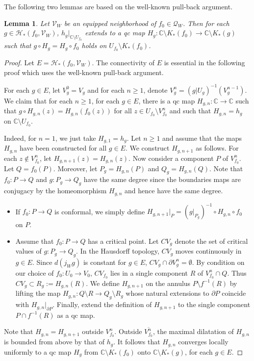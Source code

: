 \documentclass{amsart}
\numberwithin{equation}{section}
\newtheorem{lemma}[theorem]{Lemma}%
\newcommand{\C}{\mathbb C}
\theoremstyle{definition}
\theoremstyle{remark}
\begin{document}
The following two lemmas are based on the well-known pull-back argument. 
\begin{lemma}\label{lem:hgextension}
Let $\mathcal{V}_W$ be an equipped neighborhood of $f_0\in \mathcal{Q}_W$. Then for each $g\in \mathcal{H}_*(f_0,\mathcal{V}_W)$, $h_g|_{\C\setminus U_{f_0}}$ extends to a qc map $H_g:\C\setminus K_*(f_0)\to \C\setminus K_*(g)$ such that $g\circ H_g=H_g\circ f_0$ holds on $U_{f_0}\setminus K_*(f_0)$.
\end{lemma}
\begin{proof} Let $E=\mathcal{H}_*(f_0,\mathcal{V}_W)$. The connectivity of $E$ is essential in the following proof which uses the well-known pull-back argument. 

For each $g\in E$, let $V^0_g=V_g$ and for each $n\ge 1$, denote $V^n_g=(g|U_g)^{-1}(V_g^{n-1})$. We claim that for each $n\ge 1$, for each $g\in E$, there is a qc map $H_{g,n}:\C\to \C$ such that 
$g\circ H_{g,n}(z)=H_{g,n}(f_0(z))$ for all $z\in U_{f_0}\setminus V^n_{f_0}$ and such that $H_{g,n}=h_g$ on $\C\setminus U_{f_0}$. 

Indeed, for $n=1$, we just take $H_{g,1}=h_g$. Let $n\ge 1$ and assume that the maps $H_{g,n}$ have been constructed for all $g\in E$. We construct $H_{g, n+1}$ as follows. For each $z\not\in V^n_{f_0}$, let $H_{g, n+1}(z)=H_{g,n}(z)$. Now consider a component $P$ of $V_{f_0}^n$. Let $Q=f_0(P)$. Moreover, let $P_g=H_{g,n}(P)$ and $Q_g=H_{g,n}(Q)$. Note that $f_0:P\to Q$ and $g: P_g\to Q_g$ have the same degree since the boundaries maps are conjugacy by the homeomorphism $H_{g,n}$ and hence have the same degree.  
\begin{itemize}
\item If $f_0: P\to Q$ is conformal, we simply define $H_{g,{n+1}}|_P=(g|_{P_g})^{-1}\circ H_{g,n}\circ f_0$ on $P$.
\item Assume that $f_0:P\to Q$ has a critical point. Let $CV_g$ denote the set of critical values of $g:P_g\to Q_g$. In the Hausdorff topology, $CV_g$ moves continuously in $g\in E$. Since $d(j_Wg)$ is constant for $g\in E$, $CV_g\cap \partial V^n_g=\emptyset$. By condition on our choice of $f_0:U_0\to V_0$, $CV_{f_0}$ lies in a single component $R$ of $V_{f_0}^n\cap Q$. Thus $CV_g\subset R_g:=H_{g,n}(R)$. We define $H_{g,n+1}$ on the annulus $P\setminus  f^{-1}(R)$ by lifting the map $H_{g,n}: Q\setminus R\to Q_g\setminus R_g$ whose natural extensions to $\partial P$ coincide with $H_{g,n}|_{\partial P}$. Finally, extend the definition of $H_{g,n+1}$ to the single component $P\cap f^{-1}(R)$ as a qc map. 
\end{itemize}

Note that $H_{g,n}=H_{g,n+1}$ outside $V^n_{f_0}$. Outside $\overline{V^n_{f_0}}$, the maximal dilatation of $H_{g,n}$ is bounded from above by that of $h_g$. It follows that $H_{g,n}$ converges locally uniformly to a qc map $H_g$ from  $\C\setminus K_*(f_0)$ onto $\C\setminus K_*(g)$, for each $g\in E$.
\end{proof}
\end{document}
